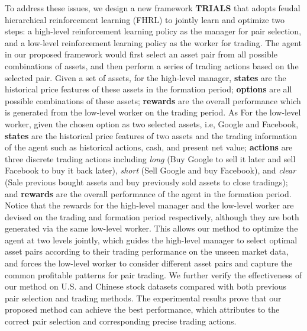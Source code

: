 \documentclass[sigconf]{acmart}
\begin{document}
To address these issues, we design a new framework \textbf{TRIALS} that adopts feudal hierarchical reinforcement learning (FHRL) \cite{Pateria2021HierarchicalRL} to jointly learn and optimize two steps: a high-level reinforcement learning policy as the manager for pair selection, and a low-level reinforcement learning policy as the worker for trading.
The agent in our proposed framework would first select an asset pair from all possible combinations of assets, and then perform a series of trading actions based on the selected pair.
Given a set of assets,
for the high-level manager, \textbf{states} are the historical price features of these assets in the formation period; \textbf{options} are all possible combinations of these assets; \textbf{rewards} are the overall performance which is generated from the low-level worker on the trading period.
As For the low-level worker, given the chosen option as two selected assets, i.e, Google and Facebook, \textbf{states} are the historical price features of two assets and the trading information of the agent such as historical actions, cash, and present net value; \textbf{actions} are three discrete trading actions including \textit{long} (Buy Google to sell it later and sell Facebook to buy it back later), \textit{short} (Sell Google and buy Facebook), and \textit{clear} (Sale previous bought assets and buy previously sold assets to close tradings); and \textbf{rewards} are the overall performance of the agent in the formation period.
Notice that the rewards for the high-level manager and the low-level worker are devised on the trading and formation period respectively, although they are both generated via the same low-level worker.
This allows our method to optimize the agent at two levels jointly, which guides the high-level manager to select optimal asset pairs according to their trading performance on the unseen market data, and forces the low-level worker to consider different asset pairs and capture the common profitable patterns for pair trading.
We further verify the effectiveness of our method on U.S. and Chinese stock datasets compared with both previous pair selection and trading methods.
The experimental results prove that our proposed method can achieve the best performance, which attributes to the correct pair selection and corresponding precise trading actions.
	
\end{document}
